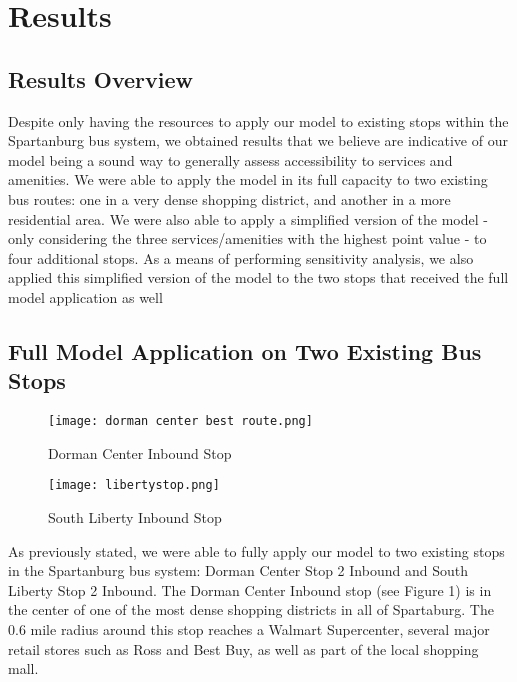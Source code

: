 \section{Results}

\subsection{Results Overview}

Despite only having the resources to apply our model to existing stops within the Spartanburg bus system, we obtained results that we believe are indicative of our model being a sound way to generally assess accessibility to services and amenities. We were able to apply the model in its full capacity to two existing bus routes: one in a very dense shopping district, and another in a more residential area. We were also able to apply a simplified version of the model - only considering the three services/amenities with the highest point value - to four additional stops. As a means of performing sensitivity analysis, we also applied this simplified version of the model to the two stops that received the full model application as well


\subsection{Full Model Application on Two Existing Bus Stops}

\begin{figure}[ht]
    \centering
    \texttt{[image: dorman center best route.png]}
    \caption {Dorman Center Inbound Stop}
    \label{fig:enter-label}
\end{figure}

\begin{figure}[ht]
    \centering
    \texttt{[image: libertystop.png]}
    \caption {South Liberty Inbound Stop}
    \label{fig:enter-label}
\end{figure}

As previously stated, we were able to fully apply our model to two existing stops in the Spartanburg bus system: Dorman Center Stop 2 Inbound and South Liberty Stop 2 Inbound. The Dorman Center Inbound stop (see Figure 1) is in the center of one of the most dense shopping districts in all of Spartaburg. The 0.6 mile radius around this stop reaches a Walmart Supercenter, several major retail stores such as Ross and Best Buy, as well as part of the local shopping mall.

